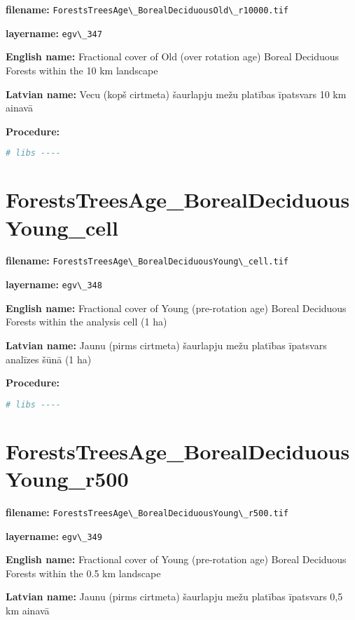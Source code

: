 \documentclass[
]{book}
\newcommand{\passthrough}[1]{#1}
\begin{document}
\textbf{filename:} \passthrough{\lstinline!ForestsTreesAge\_BorealDeciduousOld\_r10000.tif!}

\textbf{layername:} \passthrough{\lstinline!egv\_347!}

\textbf{English name:} Fractional cover of Old (over rotation age) Boreal Deciduous Forests within the 10 km landscape

\textbf{Latvian name:} Vecu (kopš cirtmeta) šaurlapju mežu platības īpatsvars 10 km ainavā

\textbf{Procedure:}

\begin{lstlisting}[language=R]
# libs ----
\end{lstlisting}

\section{ForestsTreesAge\_BorealDeciduousYoung\_cell}\label{ch06.348}

\textbf{filename:} \passthrough{\lstinline!ForestsTreesAge\_BorealDeciduousYoung\_cell.tif!}

\textbf{layername:} \passthrough{\lstinline!egv\_348!}

\textbf{English name:} Fractional cover of Young (pre-rotation age) Boreal Deciduous Forests within the analysis cell (1 ha)

\textbf{Latvian name:} Jaunu (pirms cirtmeta) šaurlapju mežu platības īpatsvars analīzes šūnā (1 ha)

\textbf{Procedure:}

\begin{lstlisting}[language=R]
# libs ----
\end{lstlisting}

\section{ForestsTreesAge\_BorealDeciduousYoung\_r500}\label{ch06.349}

\textbf{filename:} \passthrough{\lstinline!ForestsTreesAge\_BorealDeciduousYoung\_r500.tif!}

\textbf{layername:} \passthrough{\lstinline!egv\_349!}

\textbf{English name:} Fractional cover of Young (pre-rotation age) Boreal Deciduous Forests within the 0.5 km landscape

\textbf{Latvian name:} Jaunu (pirms cirtmeta) šaurlapju mežu platības īpatsvars 0,5 km ainavā
\end{document}
